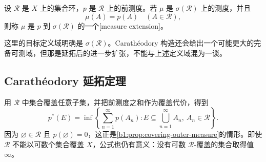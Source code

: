 \begin{definition}
\label{b1:def:extension-measure}
设 \(\mathcal R\) 是 \(X\) 上的集合环，\(p\) 是 \(\mathcal R\) 上的前测度。若 \(\mu\) 是 \(\sigma(\mathcal R)\) 上的测度，并且
\[
\mu(A)=p(A)\quad(A\in\mathcal R),
\]
则称 \(\mu\) 是 \(p\) 到 \(\sigma(\mathcal R)\) 的一个[measure extension]。
\end{definition}

这里的目标定义域明确是 \(\sigma(\mathcal R)\)。Carathéodory 构造还会给出一个可能更大的完备可测域，但那是延拓后的进一步扩张，不能与上述定义域混为一谈。

\subsection{Carathéodory 延拓定理}
\label{b1:subsec:020402}

用 \(\mathcal R\) 中集合覆盖任意子集，并把前测度之和作为覆盖代价，得到
\[
p^*(E)
=\inf\left\{
\sum_{n=1}^{\infty}p(A_n):
E\subseteq\bigcup_{n=1}^{\infty}A_n,\ A_n\in\mathcal R
\right\}.
\]
因为 \(\varnothing\in\mathcal R\) 且 \(p(\varnothing)=0\)，这正是\cref{b1:prop:covering-outer-measure}的情形。即使 \(\mathcal R\) 不能以可数个集合覆盖 \(X\)，公式也仍有意义：没有可数 \(\mathcal R\)-覆盖的集合取得值 \(\infty\)。

